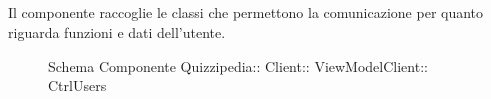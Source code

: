 \subsection{}
Il componente raccoglie le classi che permettono la comunicazione per quanto riguarda funzioni e dati dell'utente.
\begin{figure}[H]
\centering
\noindent{}
\caption[Schema Componente CtrlUsers]{Schema Componente Quizzipedia:: Client:: ViewModelClient:: CtrlUsers}
\end{figure}
